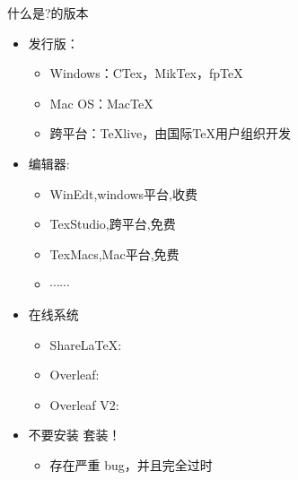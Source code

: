 \documentclass[fontset = none, xcolor=svgnames, t, aspectratio=169]{ctexbeamer}
\begin{document}
\begin{frame}[t]{什么是\latex?}{\latex 的版本}
  \stretchon
  \begin{itemize}
  \item 发行版：
    \begin{itemize}    
    \item Windows：CTex，MikTex，fpTeX
    \item Mac OS：MacTeX        
    \item 跨平台：\alert{TeXlive}，由国际{\TeX}用户组织开发
    \end{itemize}
  \item 编辑器:
    \begin{itemize}
    \item WinEdt,windows平台,收费
    \item \alert{TexStudio},跨平台,免费
    \item TexMacs,Mac平台,免费
    \item $\cdots\cdots$
    \end{itemize}
  \item 在线系统
    \begin{itemize}
    \item
      {ShareLaTeX}: 
    \item
      {Overleaf}: 
    \item
      {Overleaf V2}: 
    \end{itemize}
  \item \alert{不要安装\CTeX{} 套装！} 
    \begin{itemize}
      \item \alert{存在严重 bug，并且完全过时}
    \end{itemize}
  \end{itemize}
  \stretchoff
\end{frame}
\end{document}
